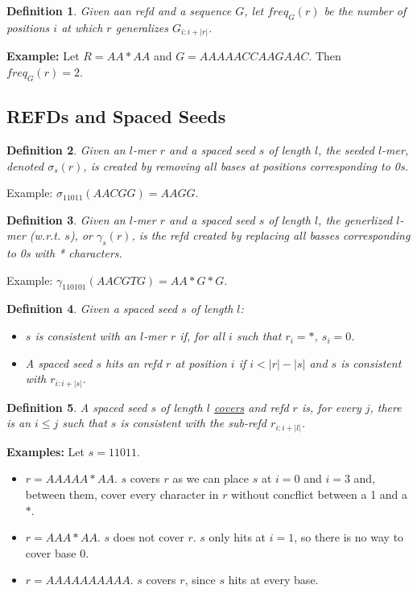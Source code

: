 \documentclass{article}
\newtheorem{definition}{Definition}
\begin{document}
\begin{definition}
Given aan refd and a sequence $G$, let $freq_G(r)$ be the number of
positions $i$ at which $r$ generalizes $G_{i:i+|r|}$.
\end{definition}

{\bf Example:} Let $R=AA*AA$ and $G=AAAAACCAAGAAC$.  Then $freq_G(r)
= 2$.  



\subsection{REFDs and Spaced Seeds}


\begin{definition}
Given an $l$-mer $r$ and a spaced seed $s$ of length $l$, the seeded
$l$-mer, denoted $\sigma_s(r)$, is created by removing all bases at
positions corresponding to 0s.
\end{definition}
Example: $\sigma_{11011}(AACGG) = AAGG$. 

\begin{definition}
\label{generalize}
Given an $l$-mer $r$ and a spaced seed $s$ of length $l$, the
generlized $l$-mer (w.r.t. $s$), or $\gamma_s(r)$, is the refd created by replacing
all basses corresponding to 0s with * characters.
\end{definition}
Example: $\gamma_{110101}(AACGTG) = AA*G*G$.

\begin{definition}
Given a spaced seed $s$ of length $l$: 
\begin{itemize}
\item $s$ is {\it consistent} with an $l$-mer $r$ if, for all
$i$ such that $r_i = *$, $s_i = 0$.  
\item A spaced seed $s$ hits an refd $r$ at position $i$ if 
  $i <|r|-|s|$ and $s$ is consistent with $r_{i:i+|s|}$.
\end{itemize}
\end{definition}

\begin{definition} 
A spaced seed $s$ of length $l$ \underline{covers} and refd $r$ is, for every $j$,
there is an $i \leq j$ such that $s$ is consistent with the sub-refd
$r_{i:i+|l|}$.
\end{definition}
{\bf Examples:} Let $s = 11011$.
\begin{itemize}
\item $r = AAAAA*AA$. $s$ covers $r$ as we can place $s$ at $i=0$ and
  $i=3$ and, between them, cover every character in $r$ without
  concflict between a 1 and a $*$.
\item $r = AAA*AA$.  $s$ does not cover $r$.  $s$ only hits at $i=1$,
  so there is no way to cover base 0.
\item $r = AAAAAAAAAA$.  $s$ covers $r$, since $s$ hits at every base.
\end{itemize}
\end{document}
